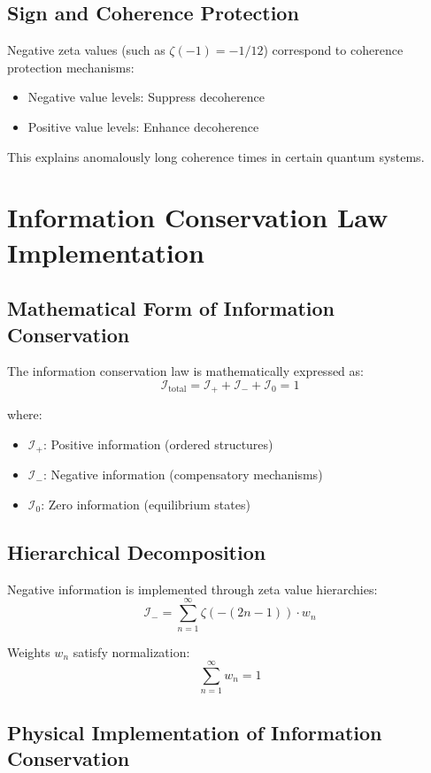 \documentclass[12pt]{article}
\begin{document}
\subsection{Sign and Coherence Protection}

Negative zeta values (such as $\zeta(-1) = -1/12$) correspond to coherence protection mechanisms:
\begin{itemize}
\item Negative value levels: Suppress decoherence
\item Positive value levels: Enhance decoherence
\end{itemize}

This explains anomalously long coherence times in certain quantum systems.

\section{Information Conservation Law Implementation}

\subsection{Mathematical Form of Information Conservation}

The information conservation law is mathematically expressed as:
$$\mathcal{I}_{\text{total}} = \mathcal{I}_+ + \mathcal{I}_- + \mathcal{I}_0 = 1$$

where:
\begin{itemize}
\item $\mathcal{I}_+$: Positive information (ordered structures)
\item $\mathcal{I}_-$: Negative information (compensatory mechanisms)
\item $\mathcal{I}_0$: Zero information (equilibrium states)
\end{itemize}

\subsection{Hierarchical Decomposition}

Negative information is implemented through zeta value hierarchies:
$$\mathcal{I}_- = \sum_{n=1}^{\infty} \zeta(-(2n-1)) \cdot w_n$$

Weights $w_n$ satisfy normalization:
$$\sum_{n=1}^{\infty} w_n = 1$$

\subsection{Physical Implementation of Information Conservation}
\end{document}
